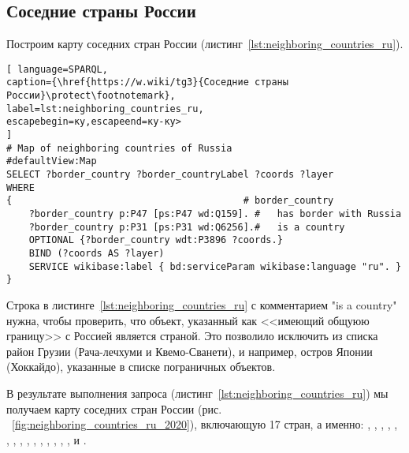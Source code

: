 \subsection{Соседние страны России}

Построим карту соседних стран России (листинг~\ref{lst:neighboring_countries_ru}).

\begin{lstlisting}[ language=SPARQL, 
caption={\href{https://w.wiki/tg3}{Соседние страны России}\protect\footnotemark},
label=lst:neighboring_countries_ru, 
escapebegin=ку,escapeend=ку-ку>
]
# Map of neighboring countries of Russia
#defaultView:Map
SELECT ?border_country ?border_countryLabel ?coords ?layer
WHERE 
{                                         # border_country
	?border_country p:P47 [ps:P47 wd:Q159]. #   has border with Russia
	?border_country p:P31 [ps:P31 wd:Q6256].#   is a country
	OPTIONAL {?border_country wdt:P3896 ?coords.}
	BIND (?coords AS ?layer)
	SERVICE wikibase:label { bd:serviceParam wikibase:language "ru". }
}
\end{lstlisting}


Строка в листинге~\ref{lst:neighboring_countries_ru} с комментарием "is a country" нужна, чтобы проверить, что объект, указанный как <<имеющий общуюю границу>> с Россией является страной. Это позволило исключить из списка район Грузии (Рача-лечхуми и Квемо-Сванети), и например, остров Японии (Хоккайдо), указанные в списке пограничных объектов.

В результате выполнения запроса (листинг~\ref{lst:neighboring_countries_ru}) мы получаем карту соседних стран России (рис. ~\ref{fig:neighboring_countries_ru_2020}), включающую 17 стран, а именно: , , , , , , , , , , , , , , ,  и .


\begin{figure*}[h]
	{
		\setlength{\fboxsep}{0pt}%
		\setlength{\fboxrule}{1pt}%
	}
	\caption{Карта соседних стран России, включающая 17 стран, 2021.
	}%
	\label{fig:neighboring_countries_ru_2020}%
\end{figure*}


